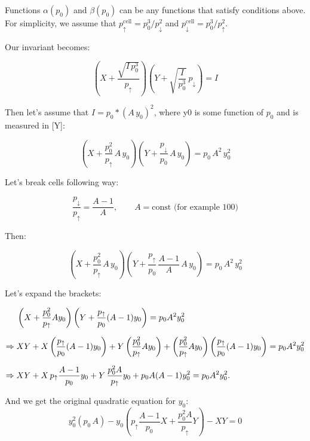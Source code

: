 \documentclass[notitlepage]{revtex4-2}
\begin{document}
Functions \(\alpha(p_0)\) and \(\beta(p_0)\) can be any functions that satisfy conditions above. For simplicity, we assume that
\(p^{\mathrm{cell}}_{\uparrow} = p_0^3 / p_\downarrow^2\) and \(p^{\mathrm{cell}}_{\downarrow} = p_0^3 / p_\uparrow^2\).

Our invariant becomes:

\begin{equation}
\label{eq:inv-1}
\left(X + \frac{\sqrt{I\,p_0^{3}}}{p_{\uparrow}}\right)
\left(Y + \sqrt{\frac{I}{p_0^{3}}}\,p_{\downarrow}\right)
= I
\end{equation}

Then let's assume that \(I = p_0 * (A\,y_0)^2\), where y0 is some function of \(p_0\) and is measured in [Y]:

\begin{equation}
\label{eq:inv-2}
\left(X + \frac{p_0^{2}}{p_{\uparrow}}\,A\,y_0\right)
\left(Y + \frac{p_{\downarrow}}{p_0}\,A\,y_0\right) = p_0\,A^2\,y_0^{2}
\end{equation}

Let's break cells following way:

\begin{equation}
\label{eq:inv-3}
\frac{p_{\downarrow}}{p_{\uparrow}} = \frac{A - 1}{A},
\qquad A = \text{const (for example } 100\text{)}
\end{equation}

Then:

\begin{equation}
\label{eq:inv-4}
\left(X + \frac{p_0^{2}}{p_{\uparrow}}\,A\,y_0 \right)
\left(Y + \frac{p_{\uparrow}}{p_0}\,\frac{A - 1}{A}\,A\,y_0\right) = p_0\,A^2\,y_0^{2}
\end{equation}

Let's expand the brackets:

\begin{align*}
\label{eq:inv-5}
&\left(X + \frac{p_0^{2}}{p_{\uparrow}}A y_0 \right)
\left(Y + \frac{p_{\uparrow}}{p_0}(A - 1) y_0\right)
= p_0 A^2 y_0^{2} \notag\\[6pt]
%
\Rightarrow\;&
XY
+ X\left(\frac{p_{\uparrow}}{p_0}(A - 1) y_0\right)
+ Y\left(\frac{p_0^{2}}{p_{\uparrow}}A y_0\right)
+ \left(\frac{p_0^{2}}{p_{\uparrow}}A y_0\right)
  \left(\frac{p_{\uparrow}}{p_0}(A - 1) y_0\right)
= p_0 A^2 y_0^{2} \\[6pt]
%
\Rightarrow\;&
XY
+ X\,p_{\uparrow}\frac{A - 1}{p_0}y_0
+ Y\,\frac{p_0^{2}A}{p_{\uparrow}}y_0
+ p_0 A (A - 1) y_0^{2}
= p_0 A^2 y_0^{2}. \notag
\end{align*}

And we get the original quadratic equation for \(y_0\):
\begin{equation}
\label{eq:inv-final}
y_0^{2}\left(p_0\,A\right)
- y_0\left(p_{\uparrow}\frac{A - 1}{p_0}X + \frac{p_0^{2}A}{p_{\uparrow}}Y\right)
- XY = 0
\end{equation}
\end{document}
